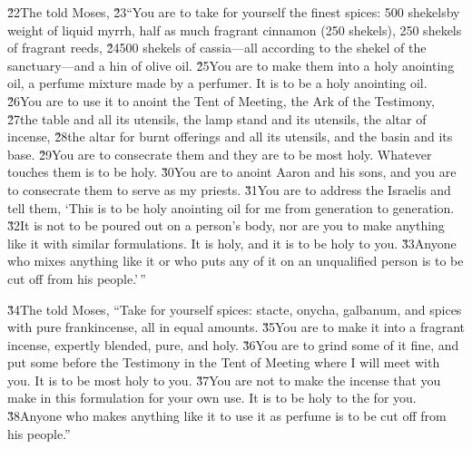 \v{22}The  told Moses, \v{23}``You are to take for yourself the finest spices: 500 shekelsby weight of liquid myrrh, half as much fragrant cinnamon (250 shekels), 250 shekels of fragrant reeds, \v{24}500 shekels of cassia---all according to the shekel of the sanctuary---and a hin of olive oil. \v{25}You are to make them into a holy anointing oil, a perfume mixture made by a perfumer. It is to be a holy anointing oil. \v{26}You are to use it to anoint the Tent of Meeting, the Ark of the Testimony, \v{27}the table and all its utensils, the lamp stand and its utensils, the altar of incense, \v{28}the altar for burnt offerings and all its utensils, and the basin and its base. \v{29}You are to consecrate them and they are to be most holy. Whatever touches them is to be holy. \v{30}You are to anoint Aaron and his sons, and you are to consecrate them to serve as my priests. \v{31}You are to address the Israelis and tell them, `This is to be holy anointing oil for me from generation to generation. \v{32}It is not to be poured out on a person's body, nor are you to make anything like it with similar formulations. It is holy, and it is to be holy to you. \v{33}Anyone who mixes anything like it or who puts any of it on an unqualified person is to be cut off from his people.'\,''

\v{34}The  told Moses, ``Take for yourself spices: stacte, onycha, galbanum, and spices with pure frankincense, all in equal amounts. \v{35}You are to make it into a fragrant incense, expertly blended, pure, and holy. \v{36}You are to grind some of it fine, and put some before the Testimony in the Tent of Meeting where I will meet with you. It is to be most holy to you. \v{37}You are not to make the incense that you make in this formulation for your own use. It is to be holy to the  for you. \v{38}Anyone who makes anything like it to use it as perfume is to be cut off from his people.''

